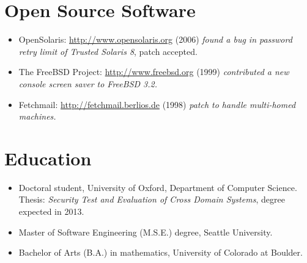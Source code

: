 \documentclass[12pt,letterpaper]{article}
\begin{document}
\section*{Open Source Software}

\begin{itemize}
	\item OpenSolaris: \url{http://www.opensolaris.org} (2006) \emph{found a bug in password
		retry limit of Trusted Solaris 8}, patch accepted.
	\item The FreeBSD Project: \url{http://www.freebsd.org} (1999) \emph{contributed a new
		console screen saver to FreeBSD 3.2.}
	\item Fetchmail: \url{http://fetchmail.berlios.de} (1998) \emph{patch to handle multi-homed
		machines.}
\end{itemize}

\vspace{-8mm}
\section*{Education}

\begin{itemize}
    \item Doctoral student, University of Oxford, Department of Computer Science.
		Thesis: \emph{Security Test
		and Evaluation of Cross Domain Systems}, degree expected in 2013.

    \item Master of Software Engineering (M.S.E.) degree, Seattle University. %

    \item Bachelor of Arts (B.A.) in mathematics, University of Colorado at Boulder.


\end{itemize}
\end{document}
